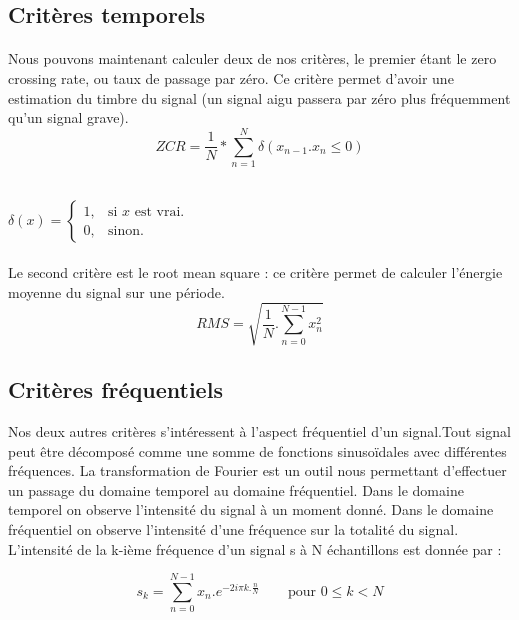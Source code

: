 \documentclass{ir}
\begin{document}
\subsection{Critères temporels}
\paragraph{}
Nous pouvons maintenant calculer deux de nos critères, le premier étant le zero crossing rate, ou taux de 
passage par zéro. Ce critère permet d’avoir une estimation du timbre du signal (un signal aigu passera par 
zéro plus fréquemment qu’un signal grave).
\begin{equation}
    ZCR = \frac{1}{N}*\sum_{n = 1}^{N} \delta( x_{n-1}.x_n \leqslant 0 )
\end{equation}

\\

$\delta(x)=\begin{cases}
    1, & \text{si $x$ est vrai}.\\
    0, & \text{sinon}.
\end{cases}$

\paragraph{}
Le second critère est le root mean square : ce critère permet de calculer l'énergie moyenne du signal sur 
une période.
\begin{equation}
    RMS = \sqrt{\frac{1}{N}.\sum_{n = 0}^{N-1} x_n^2}
\end{equation}

\subsection{Critères fréquentiels}
Nos deux autres critères s’intéressent à l’aspect fréquentiel d’un signal.Tout signal peut être décomposé 
comme une somme de fonctions sinusoïdales avec différentes fréquences. La transformation de Fourier est un 
outil nous permettant d’effectuer un passage du domaine temporel au domaine fréquentiel. Dans le domaine 
temporel on observe l’intensité du signal à un moment donné. Dans le domaine fréquentiel on observe 
l’intensité d’une fréquence sur la totalité du signal. L’intensité de la  k-ième fréquence d’un signal s à N 
échantillons est donnée par :

\begin{equation}
    s_k = \sum_{n = 0}^{N-1} x_n.e^{-2 i \pi k. \frac{n}{N}}
    \qquad\text{pour $0 \leqslant k < N$}
\end{equation}
\end{document}

